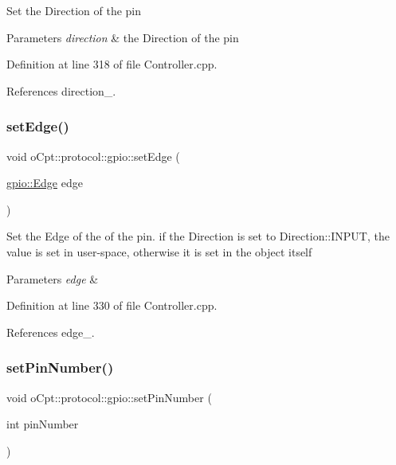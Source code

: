 Set the Direction of the pin 
\begin{DoxyParams}{Parameters}
{\em direction} & the Direction of the pin \\
\hline
\end{DoxyParams}


Definition at line 318 of file Controller.\+cpp.



References direction\+\_\+.

\hypertarget{classo_cpt_1_1protocol_1_1gpio_a026c5bceb1bff0328c2804d2748f8e3d}{}\label{classo_cpt_1_1protocol_1_1gpio_a026c5bceb1bff0328c2804d2748f8e3d} 
\subsubsection{\texorpdfstring{set\+Edge()}{setEdge()}}
{\footnotesize\ttfamily void o\+Cpt\+::protocol\+::gpio\+::set\+Edge (\begin{DoxyParamCaption}\item[{\hyperlink{classo_cpt_1_1protocol_1_1gpio_adbbd34b2bc4394ad5a71d94641dda9f9}{gpio\+::\+Edge}}]{edge }\end{DoxyParamCaption})}

Set the Edge of the of the pin. if the Direction is set to Direction\+::\+I\+N\+P\+UT, the value is set in user-\/space, otherwise it is set in the object itself 
\begin{DoxyParams}{Parameters}
{\em edge} & \\
\hline
\end{DoxyParams}


Definition at line 330 of file Controller.\+cpp.



References edge\+\_\+.

\hypertarget{classo_cpt_1_1protocol_1_1gpio_a1f3a810d9f15c6021c9df71994c08bd6}{}\label{classo_cpt_1_1protocol_1_1gpio_a1f3a810d9f15c6021c9df71994c08bd6} 
\subsubsection{\texorpdfstring{set\+Pin\+Number()}{setPinNumber()}}
{\footnotesize\ttfamily void o\+Cpt\+::protocol\+::gpio\+::set\+Pin\+Number (\begin{DoxyParamCaption}\item[{int}]{pin\+Number }\end{DoxyParamCaption})}

